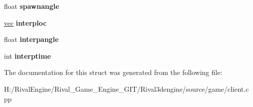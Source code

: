 \begin{DoxyCompactItemize}
float {\bfseries spawnangle}
\item 
\mbox{\label{structgame_1_1ctfclientmode_1_1flag_a6df7e9032c50c3157e36d0f7a3939036}} 
\hyperlink{structvec}{vec} {\bfseries interploc}
\item 
\mbox{\label{structgame_1_1ctfclientmode_1_1flag_af4752fae0780589f155f1af89de3692f}} 
float {\bfseries interpangle}
\item 
\mbox{\label{structgame_1_1ctfclientmode_1_1flag_ad16c49fc668cb293c3a15872c20aa736}} 
int {\bfseries interptime}
\end{DoxyCompactItemize}


The documentation for this struct was generated from the following file\+:\begin{DoxyCompactItemize}
\item 
H\+:/\+Rival\+Engine/\+Rival\+\_\+\+Game\+\_\+\+Engine\+\_\+\+G\+I\+T/\+Rival3dengine/source/game/client.\+cpp\end{DoxyCompactItemize}
